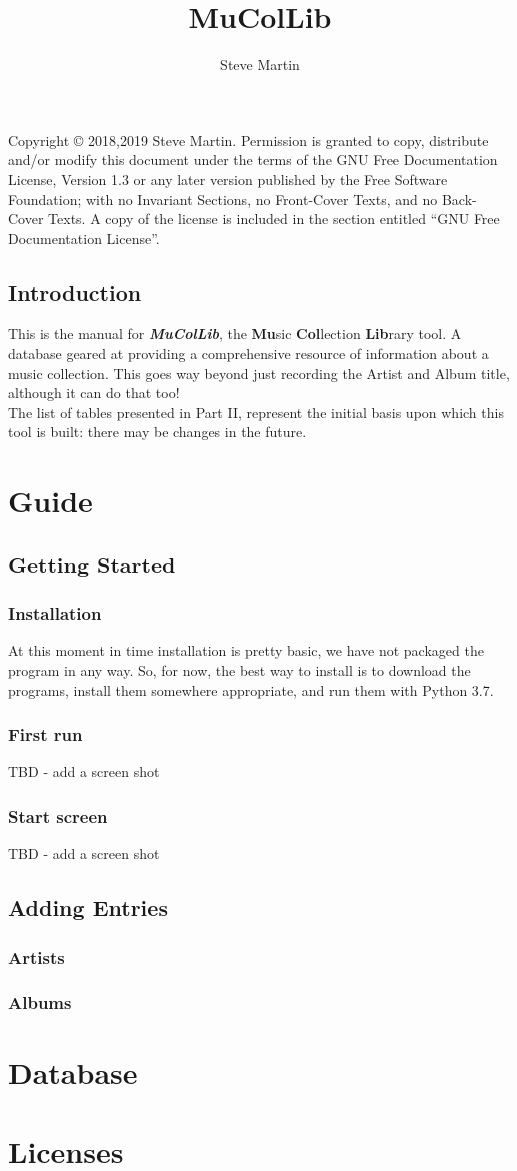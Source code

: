\documentclass[12pt,a4paper,final,twoside,titlepage]{book}
\author{\LARGE Steve Martin}
\title{\Huge MuColLib}
\begin{document}
\maketitle
\null
\vfill
Copyright \copyright{}  2018,2019  Steve Martin.
Permission is granted to copy, distribute and/or modify this document
under the terms of the GNU Free Documentation License, Version 1.3
or any later version published by the Free Software Foundation;
with no Invariant Sections, no Front-Cover Texts, and no Back-Cover Texts.
A copy of the license is included in the section entitled ``GNU
Free Documentation License''.
\frontmatter
\tableofcontents
\newpage
\chapter{Introduction}
This is the manual for \textbf{\textit{MuColLib}}, the \textbf{Mu}sic \textbf{Col}lection \textbf{Lib}rary tool. A database geared at providing a comprehensive resource of information about a music collection.  This goes way beyond just recording the Artist and Album title, although it can do that too!
\\

The list of tables presented in Part II, represent the initial basis upon which this tool is built: there may be changes in the future.
 
\mainmatter
\part{Guide}
\chapter{Getting Started}
\section{Installation}
At this moment in time installation is pretty basic, we have not packaged the program in any way.  So, for now, the best way to install is to download the programs, install them somewhere appropriate, and run them with Python 3.7.
\section{First run}
TBD - add a screen shot
\section{Start screen}
TBD - add a screen shot
\chapter{Adding Entries}
\section{Artists}
\section{Albums}
\part{Database}

\part{Licenses}

\newpage

\end{document}
